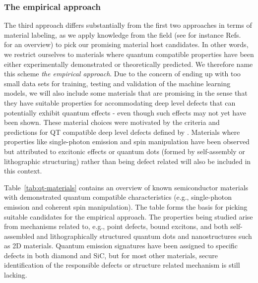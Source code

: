 \documentclass[superscriptaddress,unsortedaddress,
 amsmath,amssymb,
 aps,
]{revtex4-2}
\begin{document}
\subsubsection*{The empirical approach}
The third approach differs substantially from the first two approaches in terms of material labeling, as we apply knowledge from the field (see for instance Refs.~\cite{Atatuere2018,Zhang2020,Son2020,Toth2019,Bathen2021} for an overview) to pick our promising material host candidates.  
In other words, we restrict ourselves to materials where quantum compatible properties have been either experimentally demonstrated or theoretically predicted. 
We therefore name this scheme \emph{the empirical approach}. Due to the concern of ending up with too small data sets for training, testing and validation of the machine learning models, we will also include some  materials that are promising in the sense that they have suitable properties for accommodating deep level defects that can potentially exhibit quantum effects - even though such effects may not yet have been shown. These material choices were motivated by the criteria and predictions for QT compatible deep level defects defined by \citeauthor{Weber2010} \cite{Weber2010}. 
Materials where properties like single-photon emission and spin manipulation have been observed but attributed to excitonic effects or quantum dots (formed by self-assembly or lithographic structuring) rather than being defect related will also be included in this context.  

Table~\ref{tab:qt-materials} contains an overview of known semiconductor materials with demonstrated quantum compatible characteristics (e.g., single-photon emission and coherent spin manipulation). The table forms the basis for picking suitable candidates for the empirical approach. The properties being studied arise from mechanisms related to, e.g., point defects, bound excitons, and both self-assembled and lithographically structured quantum dots and  nanostructures such as 2D materials. 
Quantum emission signatures have been assigned to specific defects in both diamond and SiC, but for most other materials, secure identification of the responsible defects or structure related mechanism is still lacking.  

\end{document}
